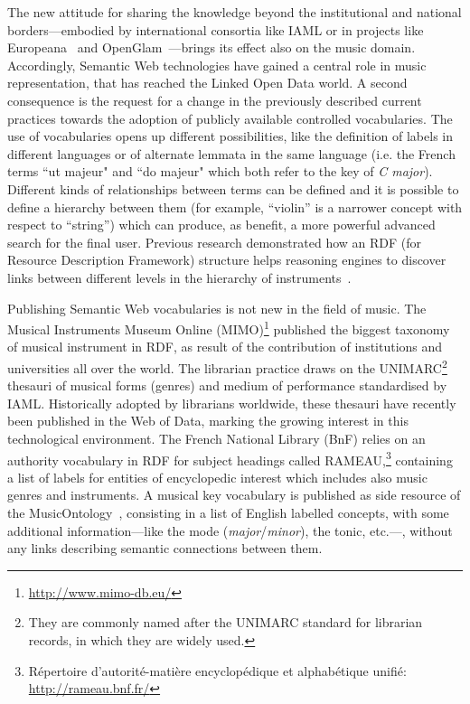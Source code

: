 \documentclass{article}
\newcommand{\etc}{etc.}
\begin{document}
The new attitude for sharing the knowledge beyond the institutional and national borders---embodied by international consortia like IAML or in projects like Europeana~\cite{europeana} and OpenGlam~\cite{estermann2016openglam}---brings its effect also on the music domain. Accordingly, Semantic Web technologies have gained a central role in music representation, that has reached the Linked Open Data world. A second consequence is the request for a change in the previously described current practices towards the adoption of publicly available controlled vocabularies.
The use of vocabularies opens up different possibilities, like the definition of labels in different languages or of alternate lemmata in the same language (i.e. the French terms ``ut majeur" and ``do majeur" which both refer to the key of \textit{C major}). Different kinds of relationships between terms can be defined and it is possible to define a hierarchy between them (for example, ``violin'' is a narrower concept with respect to ``string'') which can produce, as benefit, a more powerful advanced search for the final user. Previous research demonstrated how an RDF (for Resource Description Framework) structure helps reasoning engines to discover links between different levels in the hierarchy of instruments~\cite{kolozali2011knowledge}.

Publishing Semantic Web vocabularies is not new in the field of music. The Musical Instruments Museum Online (MIMO)\footnote{\url{http://www.mimo-db.eu/}} published the biggest taxonomy of musical instrument in RDF, as result of the contribution of institutions and universities all over the world. The librarian practice draws on the UNIMARC\footnote{They are commonly named after the UNIMARC standard for librarian records, in which they are widely used.} thesauri of musical forms (genres) and medium of performance standardised by IAML. Historically adopted by librarians worldwide, these thesauri have recently been published in the Web of Data, marking the growing interest in this technological environment. The French National Library (BnF) relies on an authority vocabulary in RDF for subject headings called RAMEAU,\footnote{R\'epertoire d'autorit\'e-mati\`ere encyclop\'edique et alphab\'etique unifi\'e: \url{http://rameau.bnf.fr/}} containing a list of labels for entities of encyclopedic interest which includes also music genres and instruments. A musical key vocabulary is published as side resource of the MusicOntology~\cite{raimond2007music}, consisting in a list of English labelled concepts, with some additional information---like the mode (\textit{major}/\textit{minor}), the tonic, \etc---, without any links describing semantic connections between them.
\end{document}
